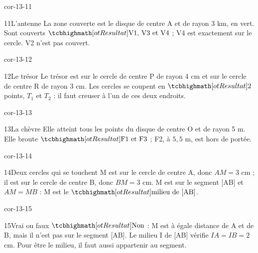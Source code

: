 \begin{blocLivre}{cor-13-11}\begin{corrige}{11}{L’antenne}
La zone couverte est le disque de centre A et de rayon 3 km, en vert. Sont couverts $\res{\text{V1, V3 et V4}}$ ; V4 est exactement sur le cercle. V2 n’est pas couvert.
\label{fig-cor-13-11}
\end{corrige}\end{blocLivre}
\begin{blocLivre}{cor-13-12}\begin{corrige}{12}{Le trésor}
Le trésor est sur le cercle de centre P de rayon 4 cm et sur le cercle de centre R de rayon 3 cm. Les cercles se coupent en $\res2$ points, $T_1$ et $T_2$ : il faut creuser à l’un de ces deux endroits.
\label{fig-cor-13-12}
\end{corrige}\end{blocLivre}
\begin{blocLivre}{cor-13-13}\begin{corrige}{13}{La chèvre}
Elle atteint tous les points du disque de centre O et de rayon 5 m. Elle broute $\res{\text{F1 et F3}}$ ; F2, à $5{,}5$ m, est hors de portée.
\label{fig-cor-13-13}
\end{corrige}\end{blocLivre}
\begin{blocLivre}{cor-13-14}\begin{corrige}{14}{Deux cercles qui se touchent}
M est sur le cercle de centre A, donc $AM=3$ cm ; il est sur le cercle de centre B, donc $BM=3$ cm. M est sur le segment [AB] et $AM=MB$ : M est le $\res{\text{milieu de [AB]}}$.
\label{fig-cor-13-14}
\end{corrige}\end{blocLivre}
\begin{blocLivre}{cor-13-15}\begin{corrige}{15}{Vrai ou faux}
$\res{\text{Non}}$ : M est à égale distance de A et de B, mais il n’est pas sur le segment [AB]. Le milieu I de [AB] vérifie $IA=IB=2$ cm. Pour être le milieu, il faut aussi appartenir au segment.
\label{fig-cor-13-15}
\end{corrige}\end{blocLivre}
